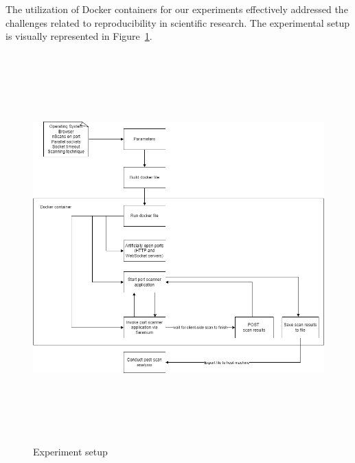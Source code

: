 The utilization of Docker containers for our experiments effectively addressed the challenges related to reproducibility in scientific research. The experimental setup is visually represented in Figure~\ref{fig:experiment}.

\begin{figure}[tbh]
    \centering
\includegraphics[width=15cm, height=15cm, keepaspectratio]{port_scanning_techniques/img/portscan_experiment.png}
    \caption{Experiment setup}
    \label{fig:experiment}
\end{figure}




